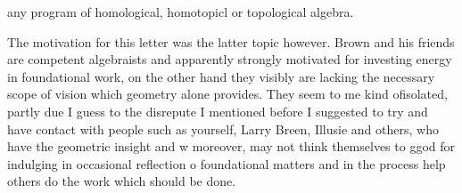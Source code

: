 
any program of homological, homotopicl or topological algebra.

The motivation for this letter was the latter topic however.  Brown and his friends are competent algebraists and apparently strongly motivated for investing energy in foundational work, on the other hand they visibly are lacking the necessary scope of vision which geometry alone provides. They seem to me kind of\unsure{:}isolated, partly due I guess to the disrepute I mentioned before  I suggested to try and have contact with people such as yourself, Larry Breen, Illusie and others, who have the geometric insight and w moreover,  may not think themselves to ggod for indulging in occasional reflection o foundational matters\handwritten{,} and in the process help others do the work which should be done.

